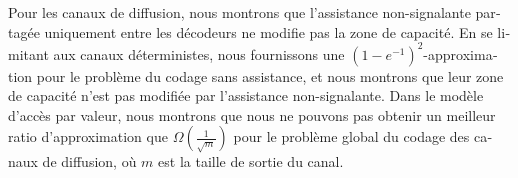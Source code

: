 \begin{otherlanguage}{french}
  Pour les canaux de diffusion, nous montrons que l'assistance non-signalante partagée uniquement entre les décodeurs ne modifie pas la zone de capacité. En se limitant aux canaux déterministes, nous fournissons une $(1-e^{-1})^2$-approximation pour le problème du codage sans assistance, et nous montrons que leur zone de capacité n'est pas modifiée par l'assistance non-signalante. Dans le modèle d'accès par valeur, nous montrons que nous ne pouvons pas obtenir un meilleur ratio d'approximation que $\Omega\left(\frac{1}{\sqrt{m}}\right)$ pour le problème global du codage des canaux de diffusion, où $m$ est la taille de sortie du canal.
\end{otherlanguage}
